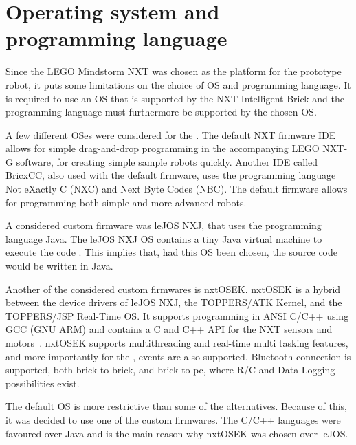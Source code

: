 \section{Operating system and programming language} \label{sec:os_and_proglanguage}
Since the LEGO Mindstorm NXT was chosen as the platform for the prototype robot, it puts some limitations on the choice of OS and programming language. It is required to use an OS that is supported by the NXT Intelligent Brick and the programming language must furthermore be supported by the chosen OS.

A few different OSes were considered for the \projname{}. The default NXT firmware IDE allows for simple drag-and-drop programming in the accompanying LEGO NXT-G software, for creating simple sample robots quickly. Another IDE called BricxCC, also used with the default firmware, uses the programming language Not eXactly C (NXC) and Next Byte Codes (NBC). The default firmware allows for programming both simple and more advanced robots. 

A considered custom firmware was leJOS NXJ, that uses the programming language Java. The leJOS NXJ OS contains a tiny Java virtual machine to execute the code \citep{lejos}. This implies that, had this OS been chosen, the source code would be written in Java.

Another of the considered custom firmwares is nxtOSEK. nxtOSEK is a hybrid between the device drivers of leJOS NXJ, the TOPPERS/ATK Kernel, and the TOPPERS/JSP Real-Time OS. It supports programming in ANSI C/C++ using GCC (GNU ARM) and contains a C and C++ API for the NXT sensors and motors~\citep{nxtosek, toppers_atk, toppers_jsp, nxtOSEK2, nxtosek_api}. nxtOSEK supports multithreading and real-time multi tasking features, and more importantly for the \projname{}, events are also supported. Bluetooth connection is supported, both brick to brick, and brick to pc, where R/C and Data Logging possibilities exist.

The default OS is more restrictive than some of the alternatives. Because of this, it was decided to use one of the custom firmwares. The C/C++ languages were favoured over Java and is the main reason why nxtOSEK was chosen over leJOS.

